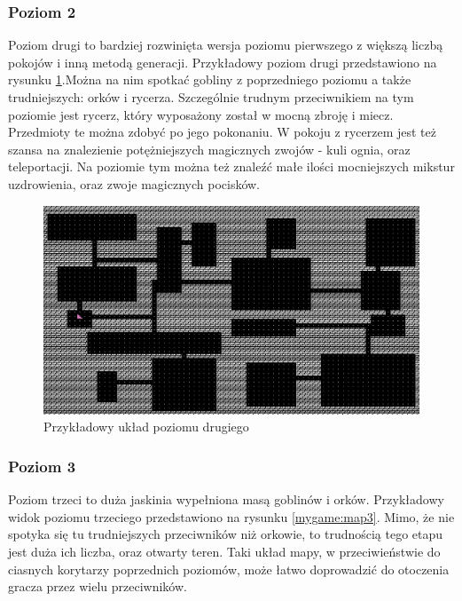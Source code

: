 \documentclass[12pt,twoside]{article}
\begin{document}
\subsubsection{Poziom 2}
Poziom drugi to bardziej rozwinięta wersja poziomu pierwszego z większą liczbą pokojów i inną metodą generacji. Przykładowy poziom drugi przedstawiono na rysunku \ref{mygame:map2}.Można na nim spotkać gobliny z poprzedniego poziomu a także trudniejszych: orków i rycerza. Szczególnie trudnym przeciwnikiem na tym poziomie jest rycerz, który wyposażony został w mocną zbroję i miecz. Przedmioty te można zdobyć  po jego pokonaniu. W pokoju z rycerzem jest też szansa na znalezienie potężniejszych magicznych zwojów - kuli ognia, oraz  teleportacji. Na poziomie tym można też znaleźć małe ilości mocniejszych mikstur uzdrowienia, oraz zwoje magicznych pocisków.


\FloatBarrier
\begin{figure}[ht]
	\centering
	\includegraphics[width=12cm]{images/mygame/map2.png}
	\caption{Przykładowy układ poziomu drugiego}
	\label{mygame:map2}
\end{figure}
\FloatBarrier


\subsubsection{Poziom 3}
Poziom trzeci to duża jaskinia wypełniona masą goblinów i orków. Przykładowy widok poziomu trzeciego przedstawiono na rysunku \ref{mygame:map3}. Mimo, że nie spotyka się tu trudniejszych przeciwników niż orkowie, to trudnością tego etapu jest duża ich liczba, oraz otwarty teren. Taki układ mapy, w przeciwieństwie do ciasnych korytarzy poprzednich poziomów, może łatwo doprowadzić do otoczenia gracza przez wielu przeciwników.
\end{document}
